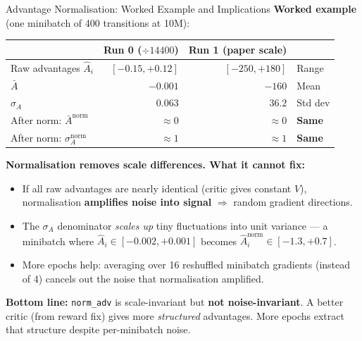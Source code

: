\documentclass[aspectratio=169,11pt]{beamer}
\begin{document}
\begin{frame}{Advantage Normalisation: Worked Example and Implications}
  \footnotesize
  \textbf{Worked example} (one minibatch of 400 transitions at 10M):
  \begin{center}
  \begin{tabular}{lrrl}
    \toprule
    & \textbf{Run 0} ($\div 14400$) & \textbf{Run 1} (paper scale) & \\
    \midrule
    Raw advantages $\hat{A}_i$ & $[-0.15, +0.12]$ & $[-250, +180]$ & Range \\
    $\bar{A}$ & $-0.001$ & $-160$ & Mean \\
    $\sigma_A$ & $0.063$ & $36.2$ & Std dev \\
    \midrule
    After norm: $\bar{A}^\text{norm}$ & $\approx 0$ & $\approx 0$ & \textbf{Same} \\
    After norm: $\sigma_A^\text{norm}$ & $\approx 1$ & $\approx 1$ & \textbf{Same} \\
    \bottomrule
  \end{tabular}
  \end{center}

  \medskip
  \textbf{Normalisation removes scale differences.  What it cannot fix:}
  \begin{itemize}\setlength\itemsep{2pt}
    \item If all raw advantages are nearly identical (critic gives constant $V$),
      normalisation \textbf{amplifies noise into signal} $\Rightarrow$ random gradient directions.
    \item The $\sigma_A$ denominator \emph{scales up} tiny fluctuations into unit variance ---
      a minibatch where $\hat{A}_i \in [-0.002, +0.001]$ becomes $\hat{A}_i^\text{norm} \in [-1.3, +0.7]$.
    \item More epochs help: averaging over 16 reshuffled minibatch gradients (instead of 4)
      cancels out the noise that normalisation amplified.
  \end{itemize}

  \medskip
  \textbf{Bottom line:} \texttt{norm\_adv} is scale-invariant but \textbf{not noise-invariant}.
  A better critic (from reward fix) gives more \emph{structured} advantages.
  More epochs extract that structure despite per-minibatch noise.
\end{frame}
\end{document}
